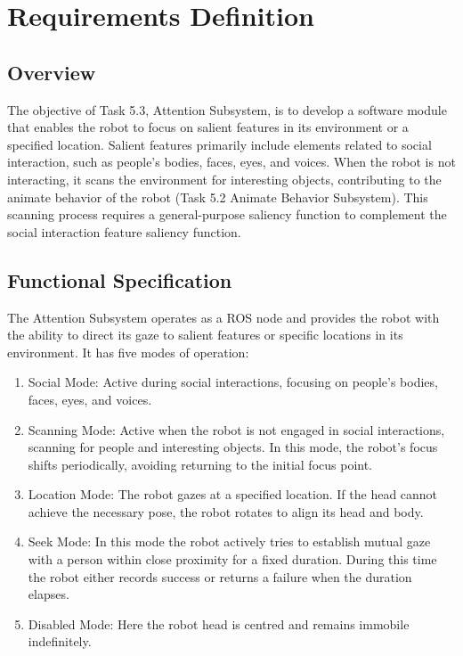 \documentclass{CSSRforAfrica}
\begin{document}
\pagebreak
\section{Requirements Definition}
 
\subsection{Overview}
 
The objective of Task 5.3, Attention Subsystem, is to develop a software module that enables the robot to focus on salient features in its environment or a specified location. Salient features primarily include elements related to social interaction, such as people's bodies, faces, eyes, and voices. When the robot is not interacting, it scans the environment for interesting objects, contributing to the animate behavior of the robot (Task 5.2 Animate Behavior Subsystem). This scanning process requires a general-purpose saliency function to complement the social interaction feature saliency function. 
 
\subsection{Functional Specification}
 
The Attention Subsystem operates as a ROS node and provides the robot with the ability to direct its gaze to salient features or specific locations in its environment. It has five modes of operation:
 \begin{enumerate}
 	\item Social Mode: Active during social interactions, focusing on people's bodies, faces, eyes, and voices.
 	\item Scanning Mode: Active when the robot is not engaged in social interactions, scanning for people and interesting objects. In this mode, the robot's focus shifts periodically, avoiding returning to the initial focus point.
 	\item Location Mode: The robot gazes at a specified location. If the head cannot achieve the necessary pose, the robot rotates to align its head and body.
 	\item Seek Mode: In this mode the robot actively tries to establish mutual gaze with a person within close proximity for a fixed duration. During this time the robot either records success or returns a failure when the duration elapses.
 	\item Disabled Mode: Here the robot head is centred and remains immobile indefinitely.
 \end{enumerate}
 
\end{document}
